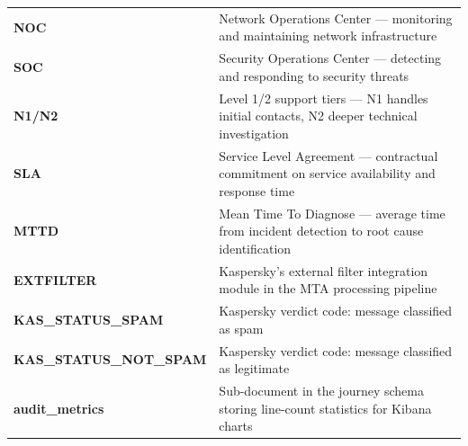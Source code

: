 \documentclass[12pt,a4paper,oneside]{report}
\newcommand{\rowA}{\rowcolor{rowgray}}
\begin{document}
\begin{longtable}{@{}>{\bfseries}p{4.5cm} >{\raggedright\arraybackslash}p{\dimexpr\linewidth-5cm\relax}@{}}
NOC & Network Operations Center --- monitoring and maintaining network infrastructure \\
\rowA SOC & Security Operations Center --- detecting and responding to security threats \\
N1/N2 & Level 1/2 support tiers --- N1 handles initial contacts, N2 deeper technical investigation \\
\rowA SLA & Service Level Agreement --- contractual commitment on service availability and response time \\
MTTD & Mean Time To Diagnose --- average time from incident detection to root cause identification \\
\rowA EXTFILTER & Kaspersky's external filter integration module in the MTA processing pipeline \\
KAS\_STATUS\_SPAM & Kaspersky verdict code: message classified as spam \\
\rowA KAS\_STATUS\_NOT\_SPAM & Kaspersky verdict code: message classified as legitimate \\
audit\_metrics & Sub-document in the journey schema storing line-count statistics for Kibana charts \\
\end{longtable}
\end{document}
